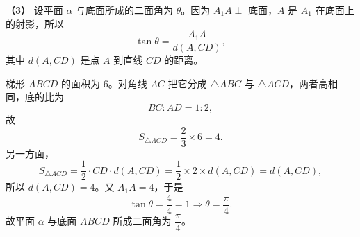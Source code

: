 \begin{answer}
\textbf{（3）} 设平面 $\alpha$ 与底面所成的二面角为 $\theta$。因为 $A_1A\perp$ 底面，$A$ 是 $A_1$ 在底面上的射影，所以
\nopagebreak[4]
\[\tan\theta=\frac{A_1A}{d(A,CD)},\]
其中 $d(A,CD)$ 是点 $A$ 到直线 $CD$ 的距离。

梯形 $ABCD$ 的面积为 $6$。对角线 $AC$ 把它分成 $\triangle ABC$ 与 $\triangle ACD$，两者高相同，底的比为
\nopagebreak[4]
\[BC:AD=1:2,\]
故
\nopagebreak[4]
\[S_{\triangle ACD}=\frac23\times6=4 .\]
另一方面，
\nopagebreak[4]
\[S_{\triangle ACD}=\frac12\cdot CD\cdot d(A,CD)
=\frac12\times2\times d(A,CD)=d(A,CD),\]
所以 $d(A,CD)=4$。又 $A_1A=4$，于是
\nopagebreak[4]
\[\tan\theta=\frac44=1\Longrightarrow\theta=\frac\pi4 .\]
故平面 $\alpha$ 与底面 $ABCD$ 所成二面角为 $\dfrac\pi4$。




\end{answer}
